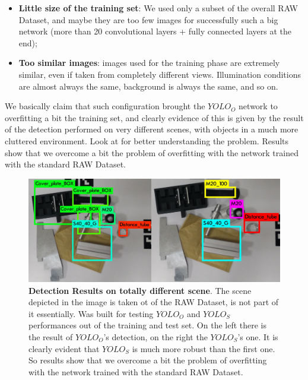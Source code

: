 \begin{itemize}
	\item \textbf{Little size of the training set}: We used only a subset of the overall RAW Dataset, and maybe they are too few images for successfully such a big network (more than 20 convolutional layers + fully connected layers at the end);
	\item \textbf{Too similar images}: images used for the training phase are extremely similar, even if taken from completely different views. Illumination conditions are almost always the same, background is always the same, and so on.
\end{itemize}

We basically claim that such configuration brought the $YOLO_O$ network to overfitting a bit the training set, and clearly evidence of this is given by the result of the detection performed on very different scenes, with objects in a much more cluttered environment. Look at  for better understanding the problem. Results show that we overcome a bit the problem of overfitting with the network trained with the standard RAW Dataset.

\begin{figure}
    \centering
    \includegraphics[width=\textwidth]{figures/4_experiments/overfitting_problem}
    \caption{\textbf{Detection Results on totally different scene}. The scene depicted in the image is taken ot of the RAW Dataset, is not part of it essentially. Was built for testing $YOLO_O$ and $YOLO_S$ performances out of the training and test set. On the left there is the result of $YOLO_O$'s detection, on the right the $YOLO_S$'s one. It is clearly evident that $YOLO_S$ is much more robust than the first one. So results show that we overcome a bit the problem of overfitting with the network trained with the standard RAW Dataset.}
    \label{fig:overfitting_problem}
\end{figure}


